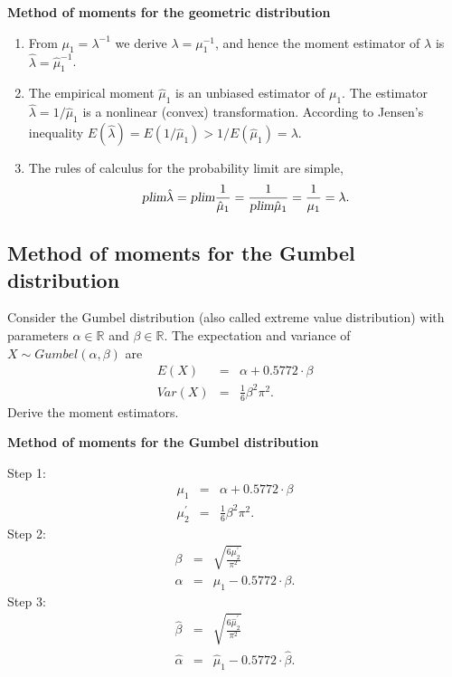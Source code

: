 \documentclass{article}
\begin{document}
\begin{solution}
\textbf{Method of moments for the geometric distribution}

\begin{enumerate}
\item From $\mu _{1}=\lambda ^{-1}$ we derive $\lambda =\mu _{1}^{-1}$, and
hence the moment estimator of $\lambda $ is $\hat{\lambda}=\hat{\mu}_{1}^{-1}
$.

\item The empirical moment $\hat{\mu}_{1}$ is an unbiased estimator of $\mu
_{1}$. The estimator $\hat{\lambda}=1/\hat{\mu}_{1}$ is a nonlinear (convex)
transformation. According to Jensen's inequality $E\left( \hat{\lambda}%
\right) =E(1/\hat{\mu}_{1})>1/E(\hat{\mu}_{1})=\lambda $.

\item The rules of calculus for the probability limit are simple,%
\begin{equation*}
\textsl{plim}\hat{\lambda}=\textsl{plim}\frac{1}{\hat{\mu}_{1}}=\frac{1}{%
\textsl{plim}\hat{\mu}_{1}}=\frac{1}{\mu _{1}}=\lambda .
\end{equation*}
\end{enumerate}
\end{solution}

\subsection{Method of moments for the Gumbel distribution}

Consider the Gumbel distribution (also called extreme value distribution)
with parameters $\alpha \in \mathbb{R}$ and $\beta \in \mathbb{R}$. The
expectation and variance of $X\sim Gumbel(\alpha ,\beta )$ are%
\begin{eqnarray*}
E(X) &=&\alpha +0.5772\cdot \beta \\
Var(X) &=&\frac{1}{6}\beta ^{2}\pi ^{2}.
\end{eqnarray*}%
Derive the moment estimators.

\begin{solution}
\textbf{Method of moments for the Gumbel distribution}

Step 1:%
\begin{eqnarray*}
\mu _{1} &=&\alpha +0.5772\cdot \beta  \\
\mu _{2}^{\prime } &=&\frac{1}{6}\beta ^{2}\pi ^{2}.
\end{eqnarray*}%
Step 2:%
\begin{eqnarray*}
\beta  &=&\sqrt{\frac{6\mu _{2}^{\prime }}{\pi ^{2}}} \\
\alpha  &=&\mu _{1}-0.5772\cdot \beta .
\end{eqnarray*}%
Step 3:%
\begin{eqnarray*}
\hat{\beta} &=&\sqrt{\frac{6\hat{\mu}_{2}^{\prime }}{\pi ^{2}}} \\
\hat{\alpha} &=&\hat{\mu}_{1}-0.5772\cdot \hat{\beta}.
\end{eqnarray*}
\end{solution}
\end{document}
